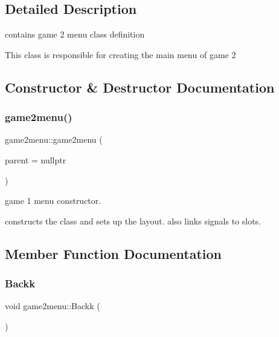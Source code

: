 \subsection{Detailed Description}
contains game 2 menu class definition 

This class is responsible for creating the main menu of game 2 

\subsection{Constructor \& Destructor Documentation}
\mbox{\label{classgame2menu_adbca99dd8b328bab30bb1a5f198cb849}} 
\subsubsection{\texorpdfstring{game2menu()}{game2menu()}}
{\footnotesize\ttfamily game2menu\+::game2menu (\begin{DoxyParamCaption}\item[{Q\+Widget $\ast$}]{parent = {\ttfamily nullptr} }\end{DoxyParamCaption})\hspace{0.3cm}{\ttfamily [explicit]}}



game 1 menu constructor. 

constructs the class and sets up the layout. also links signals to slots. 

\subsection{Member Function Documentation}
\mbox{\label{classgame2menu_a095e776799d92c9d6cb05aa49b63472a}} 
\subsubsection{\texorpdfstring{Backk}{Backk}}
{\footnotesize\ttfamily void game2menu\+::\+Backk (\begin{DoxyParamCaption}{ }\end{DoxyParamCaption})\hspace{0.3cm}{\ttfamily [slot]}}



